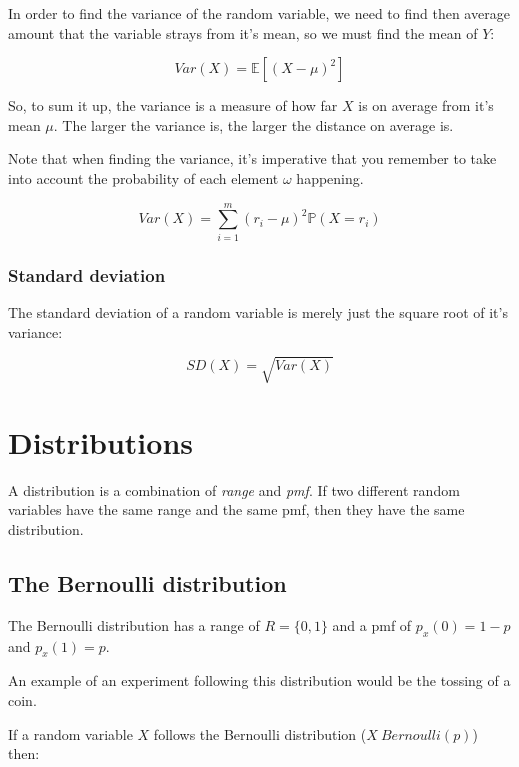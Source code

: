 In order to find the variance of the random variable, we need to find then
average amount that the variable strays from it's mean, so we must find the
mean of $Y$:

\begin{dmath*}
	Var(X) = \mathbb{E}[(X - \mu)^2]
\end{dmath*}

So, to sum it up, the variance is a measure of how far $X$ is on average from
it's mean $\mu$. The larger the variance is, the larger the distance on
average is.

Note that when finding the variance, it's imperative that you remember to take
into account the probability of each element $\omega$ happening.

\begin{dmath*}
	{Var(X) = \sum\limits_{i=1}^{m}(r_i - \mu)^2\mathbb{P}(X=r_i)}
\end{dmath*}

\subsubsection{Standard deviation}

The standard deviation of a random variable is merely just the square root of
it's variance:

\begin{dmath*}
	SD(X) = \sqrt{Var(X)}
\end{dmath*}

\section{Distributions}

A distribution is a combination of {\it range} and {\it pmf}. If two different
random variables have the same range and the same pmf, then they have the same
distribution.

\subsection{The Bernoulli distribution}

The Bernoulli distribution has a range of $R = \{0, 1\}$ and a pmf of $p_x(0) =
1-p$ and $p_x(1) = p$.

An example of an experiment following this distribution would be the tossing of
a coin.

If a random variable $X$ follows the Bernoulli distribution ($X ~ Bernoulli(p)$)
then:

